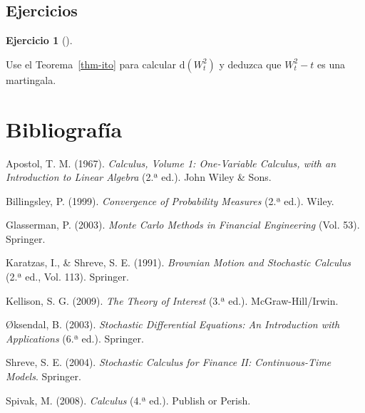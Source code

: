 \documentclass[
  spanish,
  letterpaper,
  a4paper,
  11pt,
  oneside,
  numbers=noenddot]{scrbook}
\newlength{\cslhangindent}
\newenvironment{CSLReferences}[2] %
 {\begin{list}{}{%
  \setlength{\itemindent}{0pt}
  \setlength{\leftmargin}{0pt}
  \setlength{\parsep}{0pt}
  \ifodd #1
   \setlength{\leftmargin}{\cslhangindent}
   \setlength{\itemindent}{-1\cslhangindent}
  \fi
  \setlength{\itemsep}{#2\baselineskip}}}
 {\end{list}}
\theoremstyle{definition}
\theoremstyle{plain}
\theoremstyle{definition}
\newtheorem{exercise}{Ejercicio}[chapter]
\theoremstyle{definition}
\theoremstyle{plain}
\theoremstyle{remark}
\begin{document}
\section{Ejercicios}\label{sec-ito-ejercicios}

\begin{exercise}[]\protect\hypertarget{exr-ito-1}{}\label{exr-ito-1}

Use el Teorema~\ref{thm-ito} para calcular \(\mathrm{d}(W_t^{2})\) y
deduzca que \(W_t^{2} - t\) es una martingala.

\end{exercise}


\chapter*{Bibliografía}\label{bibliografuxeda}


\protect{}\label{refs}
\begin{CSLReferences}{1}{0}
Apostol, T. M. (1967). \emph{Calculus, Volume 1: One-Variable Calculus,
with an Introduction to Linear Algebra} (2.ª ed.). John Wiley \& Sons.

Billingsley, P. (1999). \emph{Convergence of Probability Measures} (2.ª
ed.). Wiley.

Glasserman, P. (2003). \emph{Monte Carlo Methods in Financial
Engineering} (Vol. 53). Springer.

Karatzas, I., \& Shreve, S. E. (1991). \emph{Brownian Motion and
Stochastic Calculus} (2.ª ed., Vol. 113). Springer.

Kellison, S. G. (2009). \emph{The Theory of Interest} (3.ª ed.).
McGraw-Hill/Irwin.

Øksendal, B. (2003). \emph{Stochastic Differential Equations: An
Introduction with Applications} (6.ª ed.). Springer.

Shreve, S. E. (2004). \emph{Stochastic Calculus for Finance II:
Continuous-Time Models}. Springer.

Spivak, M. (2008). \emph{Calculus} (4.ª ed.). Publish or Perish.

\end{CSLReferences}


\backmatter

\printindex
\end{document}
